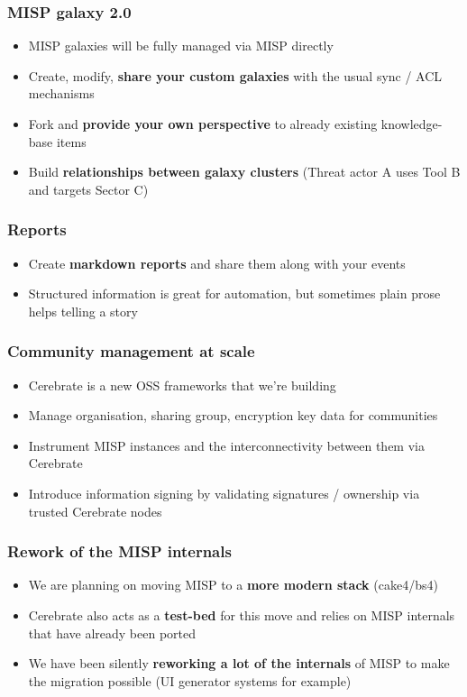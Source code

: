 \begin{frame}
\frametitle{MISP galaxy 2.0}
\begin{itemize}
	\item MISP galaxies will be fully managed via MISP directly
        \item Create, modify, {\bf share your custom galaxies} with the usual sync / ACL mechanisms
        \item Fork and {\bf provide your own perspective} to already existing knowledge-base items
        \item Build {\bf relationships between galaxy clusters} (Threat actor A uses Tool B and targets Sector C)
\end{itemize}
\end{frame}

\begin{frame}
\frametitle{Reports}
\begin{itemize}
	\item Create {\bf markdown reports} and share them along with your events
        \item Structured information is great for automation, but sometimes plain prose helps telling a story
\end{itemize}
\end{frame}

\begin{frame}
\frametitle{Community management at scale}
\begin{itemize}
	\item Cerebrate is a new OSS frameworks that we're building
        \item Manage organisation, sharing group, encryption key data for communities
        \item Instrument MISP instances and the interconnectivity between them via Cerebrate
        \item Introduce information signing by validating signatures / ownership via trusted Cerebrate nodes
\end{itemize}
\end{frame}

\begin{frame}
\frametitle{Rework of the MISP internals}
\begin{itemize}
	\item We are planning on moving MISP to a {\bf more modern stack} (cake4/bs4)
        \item Cerebrate also acts as a {\bf test-bed} for this move and relies on MISP internals that have already been ported
        \item We have been silently {\bf reworking a lot of the internals} of MISP to make the migration possible (UI generator systems for example)
\end{itemize}
\end{frame}

